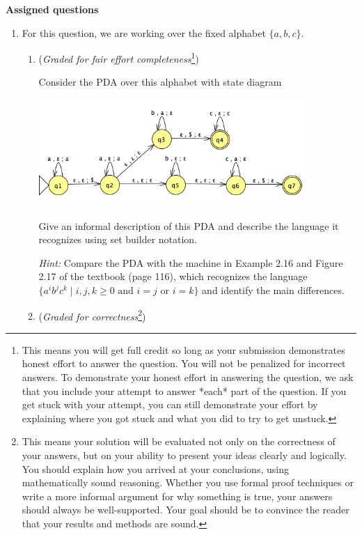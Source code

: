 \newpage
{\bf Assigned questions}
\begin{enumerate}
    \item For this question, we are working over the fixed alphabet $\{a,b,c\}$.

    \begin{enumerate}
        \item ({\it Graded for fair effort completeness}\footnote{This means 
        you will get full credit so long as your submission demonstrates honest 
        effort to answer the question. You will not be penalized for incorrect answers. 
        To demonstrate your honest effort in answering the question, we ask that you 
        include your attempt to answer *each* part of the question. If you get stuck 
        with your attempt, you can still demonstrate your effort by explaining where 
        you got stuck and what you did to try to get unstuck.})

    Consider the PDA over this alphabet with state diagram
        \begin{center}
        \includegraphics[width=4in]{../../resources/machines/hw4PDA.png}
        \end{center}

    Give an informal description of this PDA and describe the language it recognizes using 
    set builder notation.

    {\it Hint:} Compare the PDA with the machine in Example 2.16 and Figure 2.17 
    of the textbook (page 116), which recognizes 
    the language $\{a^i b^j c^k \mid i,j,k \geq 0 \textrm{ and } i=j \textrm{ or } i=k\}$ and 
    identify the main differences. 

    \item  ({\it Graded for correctness}\footnote{This means your solution will be
    evaluated not only on the correctness of your answers, but on your ability to 
    present your ideas clearly and logically. You should explain how you arrived at 
    your conclusions, using  mathematically sound reasoning. Whether you use formal proof techniques or 
    write a more informal argument for why 
    something is true, your answers should always be well-supported. Your goal 
    should be to convince the reader that 
    your results and methods are sound.}) 


\end{enumerate}
\end{enumerate}
